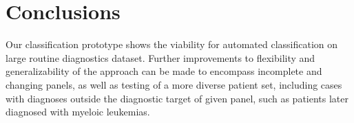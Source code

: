 \documentclass[11pt,a4paper]{article}
\begin{document}
\section{Conclusions}

Our classification prototype shows the viability for automated classification on large routine diagnostics dataset.
Further improvements to flexibility and generalizability of the approach can be made to encompass incomplete and changing panels, as well as testing of a more diverse patient set, including cases with diagnoses outside the diagnostic target of given panel, such as patients later diagnosed with myeloic leukemias.





\end{document}
